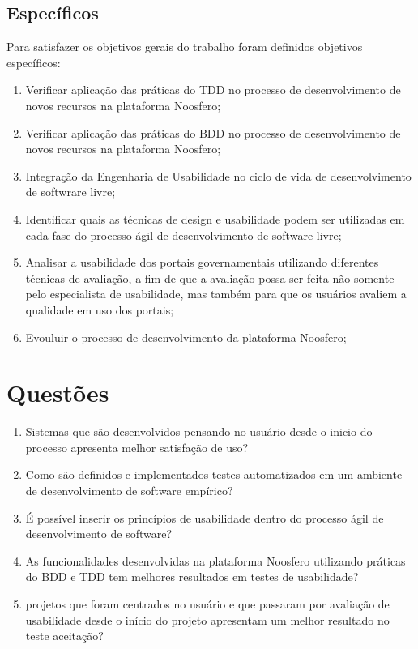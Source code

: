 	 
	 
	\subsection{Específicos}

	 Para satisfazer os objetivos gerais do trabalho foram definidos objetivos específicos:

	\begin{enumerate}
	\item Verificar aplicação das práticas do TDD no processo de desenvolvimento de novos recursos na plataforma Noosfero;
	\item Verificar aplicação das práticas do BDD no processo de desenvolvimento de novos recursos na plataforma Noosfero;
	\item Integração da Engenharia de Usabilidade no ciclo de vida de desenvolvimento de softwrare livre;
	\item Identificar quais as técnicas de design e usabilidade  podem ser utilizadas em cada fase do processo ágil de desenvolvimento de software livre;
	\item Analisar a usabilidade dos portais governamentais utilizando diferentes técnicas de avaliação, a fim de que a avaliação possa ser feita não somente pelo especialista de usabilidade, mas também para que os usuários avaliem a qualidade em uso dos portais;
	\item Evouluir o processo de desenvolvimento da plataforma Noosfero;
	\end{enumerate}

	\section{Questões}
	\begin{enumerate}
	\item Sistemas que são desenvolvidos pensando no usuário desde o inicio do processo apresenta melhor  satisfação de uso?
	\item Como são definidos e implementados testes automatizados em um ambiente de desenvolvimento de software empírico?
	\item É possível inserir os princípios de usabilidade dentro do processo ágil de desenvolvimento de software?
	\item As funcionalidades desenvolvidas na plataforma Noosfero utilizando práticas do BDD e TDD tem melhores resultados em testes de usabilidade?
	\item projetos que foram centrados no usuário e que passaram por avaliação de usabilidade desde o início do projeto apresentam um melhor resultado no teste aceitação?
	\end{enumerate}
	 
